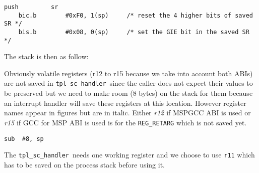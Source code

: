 \documentclass[11pt, oneside]{article}   	%
\newcommand{\sch}{\lstinline{tpl_sc_handler}}
\begin{document}
\begin{lstlisting}[backgroundcolor=\color{yellow!15}]
    push         sr
    bic.b        #0xF0, 1(sp)     /* reset the 4 higher bits of saved SR */
    bis.b        #0x08, 0(sp)     /* set the GIE bit in the saved SR     */
\end{lstlisting}

The stack is then as follow:

\begin{center}
\end{center}

Obviously volatile registers (r12 to r15 because we take into account both ABIs) are not saved in \sch\ since the caller does not expect their values to be preserved but we need to make room (8 bytes) on the stack for them because an interrupt handler will save these registers at this location. However register names appear in figures but are in italic. Either \textit{r12} if MSPGCC ABI is used or \textit{r15} if GCC for MSP ABI is used is for the \lstinline{REG_RETARG} which is not saved yet.

\begin{lstlisting}[backgroundcolor=\color{yellow!15}]
    sub  #8, sp
\end{lstlisting}

The \sch\ needs one working register and we choose to use \lstinline{r11} which has to be saved on the process stack before using it.
\end{document}
